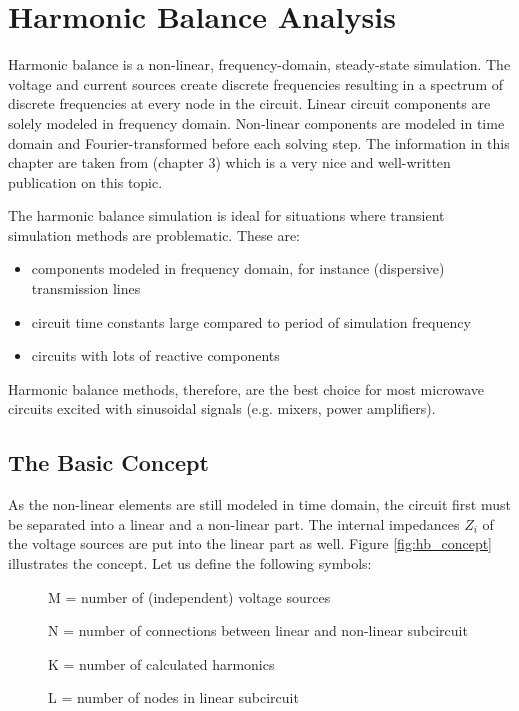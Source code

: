 %
%
%
%

\chapter{Harmonic Balance Analysis}
\label{sec:hb_analysis}

Harmonic balance is a non-linear, frequency-domain, steady-state
simulation.  The voltage and current sources create discrete
frequencies resulting in a spectrum of discrete frequencies at every
node in the circuit. Linear circuit components are solely modeled in
frequency domain. Non-linear components are modeled in time domain and
Fourier-transformed before each solving step.  The information in
this chapter are taken from \cite{Maas1} (chapter 3) which is a very
nice and well-written publication on this topic.

\addvspace{12pt}

The harmonic balance simulation is ideal for situations where
transient simulation methods are problematic. These are:
\begin{itemize}
\item components modeled in frequency domain, for instance (dispersive)
      transmission lines
\item circuit time constants large compared to period of simulation
      frequency
\item circuits with lots of reactive components
\end{itemize}
Harmonic balance methods, therefore, are the best choice for most microwave
circuits excited with sinusoidal signals (e.g. mixers, power amplifiers).


\section{The Basic Concept}

As the non-linear elements are still modeled in time domain, the circuit
first must be separated into a linear and a non-linear part. The
internal impedances $Z_i$ of the voltage sources are put into the
linear part as well. Figure \ref{fig:hb_concept} illustrates the
concept. Let us define the following symbols:
\begin{description}
\item[] M = number of (independent) voltage sources
\item[] N = number of connections between linear and non-linear subcircuit
\item[] K = number of calculated harmonics
\item[] L = number of nodes in linear subcircuit
\end{description}

